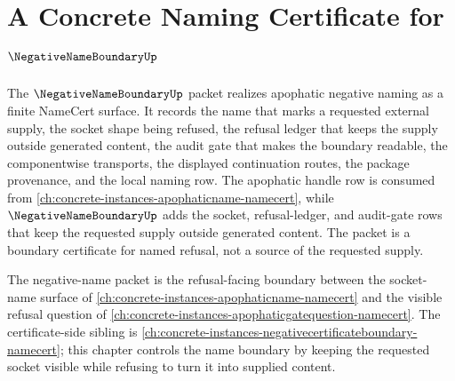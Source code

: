 \chapter{A Concrete Naming Certificate for $\NegativeNameBoundaryUp$}
\label{ch:concrete-instances-negative-name-boundary-namecert}

The $\NegativeNameBoundaryUp$ packet realizes apophatic negative naming as a finite NameCert surface. It records the name that marks a requested external supply, the socket shape being refused, the refusal ledger that keeps the supply outside generated content, the audit gate that makes the boundary readable, the componentwise transports, the displayed continuation routes, the package provenance, and the local naming row. The apophatic handle row is consumed from \autoref{ch:concrete-instances-apophaticname-namecert}, while $\NegativeNameBoundaryUp$ adds the socket, refusal-ledger, and audit-gate rows that keep the requested supply outside generated content. The packet is a boundary certificate for named refusal, not a source of the requested supply.

The negative-name packet is the refusal-facing boundary between the socket-name surface of \autoref{ch:concrete-instances-apophaticname-namecert} and the visible refusal question of \autoref{ch:concrete-instances-apophaticgatequestion-namecert}. The certificate-side sibling is \autoref{ch:concrete-instances-negativecertificateboundary-namecert}; this chapter controls the name boundary by keeping the requested socket visible while refusing to turn it into supplied content.

